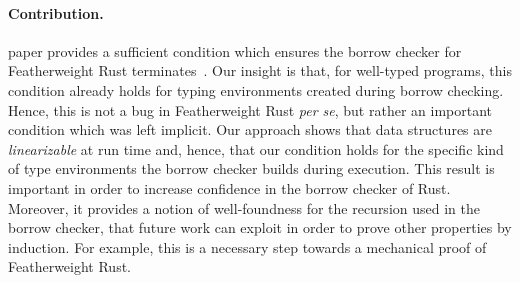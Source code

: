 \paragraph{Contribution.}

 paper provides a sufficient condition
which ensures the borrow checker for Featherweight Rust
terminates~\cite{Pearce21}.  Our insight is that, for well-typed
programs, this condition already holds for typing environments created
during borrow checking.  Hence, this is not a bug in Featherweight
Rust {\em per se}, but rather an important condition which was left
implicit.  Our approach shows that data structures are
\emph{linearizable} at run time and, hence, that our condition holds
for the specific kind of type environments the borrow checker builds
during execution.  This result is important in order to increase
confidence in the borrow checker of Rust.  Moreover, it provides a
notion of well-foundness for the recursion used in the borrow checker,
that future work can exploit in order to prove other properties by
induction.  For example, this is a necessary step towards a mechanical
proof of Featherweight Rust.
